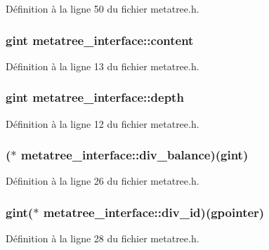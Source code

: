 Définition à la ligne 50 du fichier metatree.h.

\subsubsection[{content}]{\setlength{\rightskip}{0pt plus 5cm}gint {\bf metatree\_\-interface::content}}\label{structmetatree__interface_ac1c0431807412961f368e085c5725890}


Définition à la ligne 13 du fichier metatree.h.

\subsubsection[{depth}]{\setlength{\rightskip}{0pt plus 5cm}gint {\bf metatree\_\-interface::depth}}\label{structmetatree__interface_aace6dc61ff0a82159daceecc337ea859}


Définition à la ligne 12 du fichier metatree.h.

\subsubsection[{div\_\-balance}]{($\ast$  {\bf metatree\_\-interface::div\_\-balance})(gint)}\label{structmetatree__interface_a0b3b6060b22b0a42cb4e2f5a78447b07}


Définition à la ligne 26 du fichier metatree.h.

\subsubsection[{div\_\-id}]{\setlength{\rightskip}{0pt plus 5cm}gint($\ast$  {\bf metatree\_\-interface::div\_\-id})(gpointer)}\label{structmetatree__interface_acf4885e6b2d5fa5418d5fd1a0c46d860}


Définition à la ligne 28 du fichier metatree.h.

